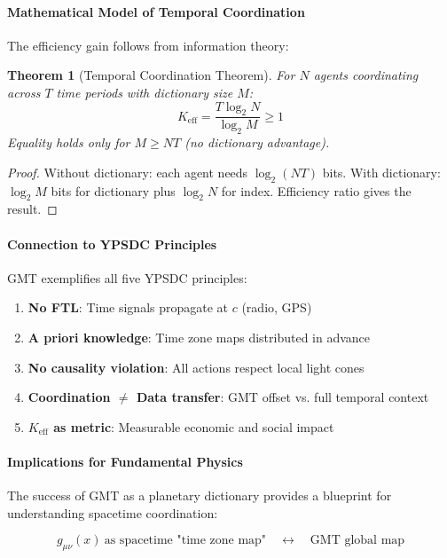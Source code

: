 \documentclass[11pt,a4paper]{article}
\newtheorem{theorem}{Theorem}
\begin{document}
	\paragraph{Mathematical Model of Temporal Coordination}
	The efficiency gain follows from information theory:
	
	\begin{theorem}[Temporal Coordination Theorem]
		For $N$ agents coordinating across $T$ time periods with dictionary size $M$:
		\begin{equation}
			K_{\mathrm{eff}} = \frac{T \log_2 N}{\log_2 M} \geq 1
		\end{equation}
		Equality holds only for $M \geq NT$ (no dictionary advantage).
	\end{theorem}
	
	\begin{proof}
		Without dictionary: each agent needs $\log_2(NT)$ bits. With dictionary: $\log_2 M$ bits for dictionary plus $\log_2 N$ for index. Efficiency ratio gives the result.
	\end{proof}
	
	\paragraph{Connection to YPSDC Principles}
	GMT exemplifies all five YPSDC principles:
	\begin{enumerate}
		\item \textbf{No FTL}: Time signals propagate at $c$ (radio, GPS)
		\item \textbf{A priori knowledge}: Time zone maps distributed in advance
		\item \textbf{No causality violation}: All actions respect local light cones
		\item \textbf{Coordination $\neq$ Data transfer}: GMT offset vs. full temporal context
		\item \textbf{$K_{\mathrm{eff}}$ as metric}: Measurable economic and social impact
	\end{enumerate}
	
	\paragraph{Implications for Fundamental Physics}
	The success of GMT as a planetary dictionary provides a blueprint for understanding spacetime coordination:
	
	\begin{equation}
		g_{\mu\nu}(x) \ \text{as spacetime "time zone map"} \quad \leftrightarrow \quad \text{GMT global map}
	\end{equation}
	
\end{document}

